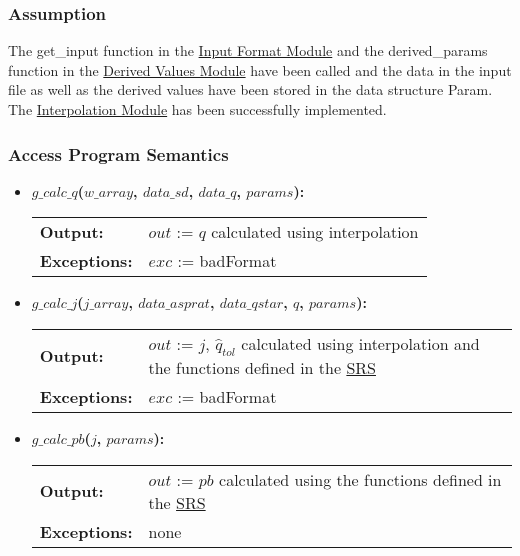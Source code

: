 \documentclass[12pt]{article}
\newcommand{\InputFormat}{\hyperref[SecInF]{Input Format Module}}
\newcommand{\DerivedVal}{\hyperref[SecDeV]{Derived Values Module}}
\newcommand{\Interp}{\hyperref[SecInterp]{Interpolation Module}}
\begin{document}
\subsubsection{Assumption}

The get\_input function in the \InputFormat{} and the derived\_params function
in the \DerivedVal{} have been called and the data in the input file as well as
the derived values have been stored in the data structure Param.
\noindent The \Interp{} has been successfully implemented.

\subsubsection{Access Program Semantics}

\begin{itemize}
\item\textbf{$g\_calc\_q$($w\_array$, $data\_sd$, $data\_q$, $params$):} \\ \newline
\begin{tabular}{l p{}}
\textbf{Output:} & $out$ := $q$ calculated using interpolation\\ 
\textbf{Exceptions:} & $exc$ := badFormat \\
\end{tabular}

\item\textbf{$g\_calc\_j$($j\_array$, $data\_asprat$, $data\_qstar$, $q$, $params$):} \\ \newline
\begin{tabular}{l p{}}
\textbf{Output:} & $out$ := $j$, $\hat{q}_{tol}$ calculated using 
interpolation and the functions defined in the \href{../SRS/glassbr_srs.pdf}{SRS} \\
\textbf{Exceptions:} & $exc$ := badFormat \\
\end{tabular}

\item\textbf{$g\_calc\_pb$($j$, $params$):} \\ \newline
\begin{tabular}{l p{}}
\textbf{Output:} & $out$ := $pb$ calculated using the functions defined in the \href{../SRS/glassbr_srs.pdf}{SRS} \\ 
\textbf{Exceptions:} & none \\ 
\end{tabular}


\end{itemize}
\end{document}
